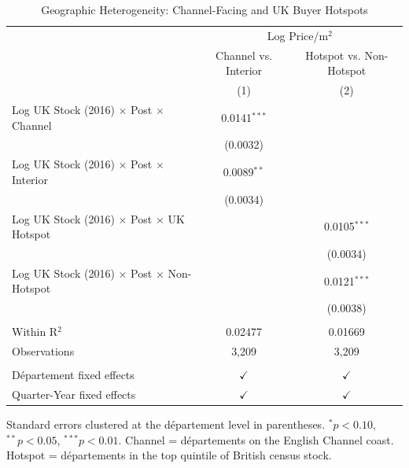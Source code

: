 
\begin{table}[htbp]
   \caption{\label{tab:geographic} Geographic Heterogeneity: Channel-Facing and UK Buyer Hotspots}
   \bigskip
   \centering
   \begin{tabular}{lcc}
      \toprule
       & \multicolumn{2}{c}{Log Price/m$^2$}\\
                                                                    & Channel vs. Interior & Hotspot vs. Non-Hotspot \\   
                                                                    & (1)                  & (2)\\  
      \midrule 
      Log UK Stock (2016) $\times$ Post $\times$ Channel            & 0.0141$^{***}$       &   \\   
                                                                    & (0.0032)             &   \\   
      Log UK Stock (2016) $\times$ Post $\times$ Interior      & 0.0089$^{**}$        &   \\   
                                                                    & (0.0034)             &   \\   
      Log UK Stock (2016) $\times$ Post $\times$ UK Hotspot         &                      & 0.0105$^{***}$\\   
                                                                    &                      & (0.0034)\\   
      Log UK Stock (2016) $\times$ Post $\times$ Non-Hotspot   &                      & 0.0121$^{***}$\\   
                                                                    &                      & (0.0038)\\   
       \\
      Within R$^2$                                                  & 0.02477              & 0.01669\\  
      Observations                                                  & 3,209                & 3,209\\  
       \\
      D\'epartement fixed effects                                   & $\checkmark$         & $\checkmark$\\   
      Quarter-Year fixed effects                                    & $\checkmark$         & $\checkmark$\\   
      \bottomrule
   \end{tabular}
\par\vspace{0.3em}\noindent\footnotesize Standard errors clustered at the d\'epartement level in parentheses. $^{*}p<0.10$, $^{**}p<0.05$, $^{***}p<0.01$. Channel = d\'epartements on the English Channel coast. Hotspot = d\'epartements in the top quintile of British census stock.
\end{table}


